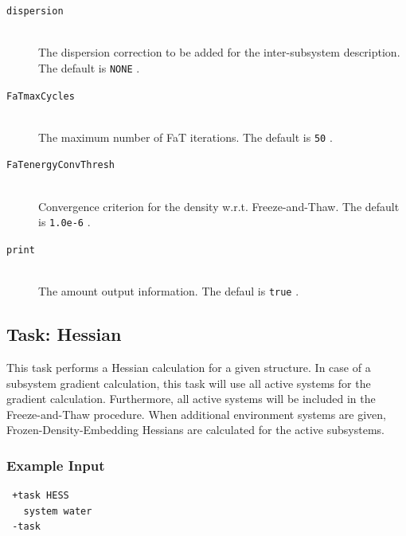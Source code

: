 \documentclass[bibliography=totocnumbered,a4paper,10pt,oneside]{scrbook}
\newcommand{\ttt}[1]{%
  \begingroup\setlength{\fboxsep}{1pt}%
  \colorbox{serenity-green!30}{\texttt{\hspace*{2pt}\vphantom{(g}#1\hspace*{2pt}}}%
  \endgroup
}
\begin{document}
\begin{description}
\item [\texttt{dispersion}]\hfill \\
  The dispersion correction to be added for the inter-subsystem description. The default is \ttt{NONE}.\
\item [\texttt{FaTmaxCycles}]\hfill \\
  The maximum number of FaT iterations. The default is \ttt{50}.
\item [\texttt{FaTenergyConvThresh}]\hfill \\
  Convergence criterion for the density w.r.t. Freeze-and-Thaw. The default is \ttt{1.0e-6}.
\item [\texttt{print}]\hfill \\
  The amount output information. The defaul is \ttt{true}.
\end{description}

\subsection{Task: Hessian}
This task performs a Hessian calculation for a given structure. In case of a subsystem gradient calculation, this task will use all active systems for the gradient calculation. Furthermore, all active systems will be included in the Freeze-and-Thaw procedure. When additional environment systems are given, Frozen-Density-Embedding Hessians are calculated for the active subsystems.
\subsubsection{Example Input}
\begin{lstlisting}
 +task HESS
   system water
 -task
\end{lstlisting}
\end{document}
